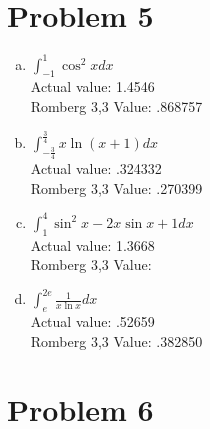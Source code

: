 \documentclass[11pt]{article} %
\begin{document}
\section*{Problem 5}
\begin{enumerate}[a.)]
\item $\int_{-1}^{1} \cos^2xdx$\\
Actual value: 1.4546 \\
Romberg 3,3 Value: .868757

\item $\int_{-\frac{3}{4}}^{\frac{3}{4}} x \ln(x+1) dx$\\
Actual value: .324332 \\
Romberg 3,3 Value: .270399

\item $\int_{1}^{4} \sin^2x - 2x\sin x +1 dx$\\
Actual value: 1.3668 \\
Romberg 3,3 Value: 

\item $\int_{e}^{2e} \frac{1}{x\ln x}dx$\\
Actual value: .52659\\
Romberg 3,3 Value: .382850
\end{enumerate}

\section*{Problem 6}
\end{document}
